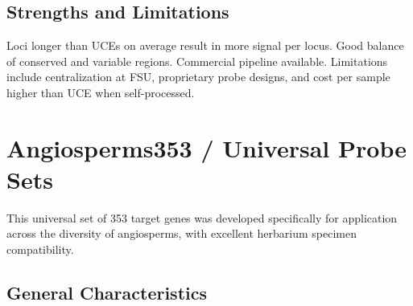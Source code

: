 \subsection{Strengths and Limitations}

Loci longer than UCEs on average result in more signal per locus. Good balance of conserved and variable regions. Commercial pipeline available. Limitations include centralization at FSU, proprietary probe designs, and cost per sample higher than UCE when self-processed.

\textcite{lemmon2012, prum2015, hime2021, breinholt2018}

\section{Angiosperms353 / Universal Probe Sets}

This universal set of 353 target genes was developed specifically for application across the diversity of angiosperms, with excellent herbarium specimen compatibility.

\subsection{General Characteristics}

